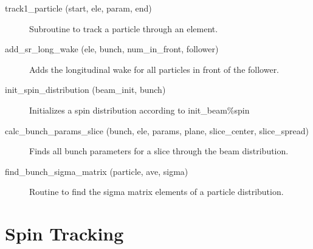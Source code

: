 \begin{description}
\item[track1_particle (start, ele, param, end)] \Newline 
Subroutine to track a particle through an element.

\item[add_sr_long_wake (ele, bunch, num_in_front, follower)] \Newline 
Adds the longitudinal wake for all particles in front of the follower.

\item[init_spin_distribution (beam_init, bunch)] \Newline 
Initializes a spin distribution according to init_beam\%spin

\item[calc_bunch_params_slice (bunch, ele, params, plane, slice_center, slice_spread)] \Newline 
Finds all bunch parameters for a slice through the beam distribution.

\item[find_bunch_sigma_matrix (particle, ave, sigma)] \Newline 
Routine to find the sigma matrix elements of a particle distribution.

\end{description}

\section{Spin Tracking}
\label{r:spin.track}    

